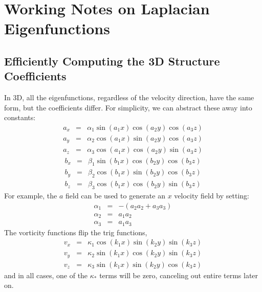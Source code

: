 \documentclass[12pt,onecolumn]{article}
\begin{document}
\vspace*{1em}
\section{Working Notes on Laplacian Eigenfunctions}
\subsection{Efficiently Computing the 3D Structure Coefficients}
In 3D, all the eigenfunctions, regardless of the velocity direction, have the same form, but the coefficients differ. For simplicity, we can abstract these away into constants:
\begin{eqnarray*}
a_x &=& \alpha_1 \sin(a_1 x) \cos(a_2 y) \cos(a_3 z) \\
a_y &=& \alpha_2 \cos(a_1 x) \sin(a_2 y) \cos(a_3 z) \\
a_z &=& \alpha_3 \cos(a_1 x) \cos(a_2 y) \sin(a_3 z)
\end{eqnarray*}
\begin{eqnarray*}
b_x &=& \beta_1 \sin(b_1 x) \cos(b_2 y) \cos(b_3 z) \\
b_y &=& \beta_2 \cos(b_1 x) \sin(b_2 y) \cos(b_3 z) \\
b_z &=& \beta_3 \cos(b_1 x) \cos(b_2 y) \sin(b_3 z)
\end{eqnarray*}
For example, the $a$ field can be used to generate an $x$ velocity field by setting:
\begin{eqnarray*}
\alpha_1 &=& -(a_2  a_2 + a_3 a_3) \\
\alpha_2 &=& a_1 a_2 \\
\alpha_3 &=& a_1 a_3
\end{eqnarray*}
The vorticity functions flip the trig functions,
\begin{eqnarray*}
v_x &=& \kappa_1 \cos(k_1 x) \sin(k_2 y) \sin(k_3 z) \\
v_y &=& \kappa_2 \sin(k_1 x) \cos(k_2 y) \sin(k_3 z) \\
v_z &=& \kappa_3 \sin(k_1 x) \sin(k_2 y) \cos(k_3 z)
\end{eqnarray*}
and in all cases, one of the $\kappa_*$ terms will be zero, canceling out entire terms later on. 
\end{document}
